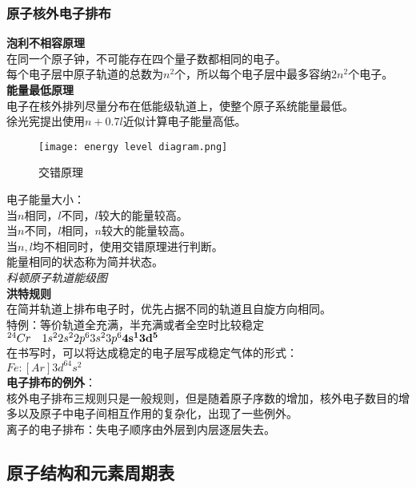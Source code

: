 \documentclass[utf8,a4paper,12pt]{ctexart}
\begin{document}
\subsubsection{原子核外电子排布}
{\bf 泡利不相容原理}\\
在同一个原子钟，不可能存在四个量子数都相同的电子。\\
每个电子层中原子轨道的总数为$n^2$个，所以每个电子层中最多容纳$2n^2$个电子。\\
{\bf 能量最低原理}\\
电子在核外排列尽量分布在低能级轨道上，使整个原子系统能量最低。\\
徐光宪提出使用$n+0.7l$近似计算电子能量高低。\\
\begin{figure}[H]
\centering
\texttt{[image: energy level diagram.png]}
\caption{交错原理}
\end{figure}
电子能量大小：\\
当$n$相同，$l$不同，$l$较大的能量较高。\\
当$n$不同，$l$相同，$n$较大的能量较高。\\
当$n,l$均不相同时，使用交错原理进行判断。\\
能量相同的状态称为简并状态。\\
\emph{科顿原子轨道能级图}\\

{\bf 洪特规则}\\
在简并轨道上排布电子时，优先占据不同的轨道且自旋方向相同。\\
特例：等价轨道全充满，半充满或者全空时比较稳定\\
$^{24} Cr\quad 1s^2 2s^2 2p^6 3s^2 3p^6 {\bf 4s^1 3d^5}$\\
在书写时，可以将达成稳定的电子层写成稳定气体的形式：\\
$Fe:[Ar]3d^64s^2$\\
{\bf 电子排布的例外}：\\
核外电子排布三规则只是一般规则，但是随着原子序数的增加，核外电子数目的增多以及原子中电子间相互作用的复杂化，出现了一些例外。\\
离子的电子排布：失电子顺序由外层到内层逐层失去。
\subsection{原子结构和元素周期表}
\end{document}
